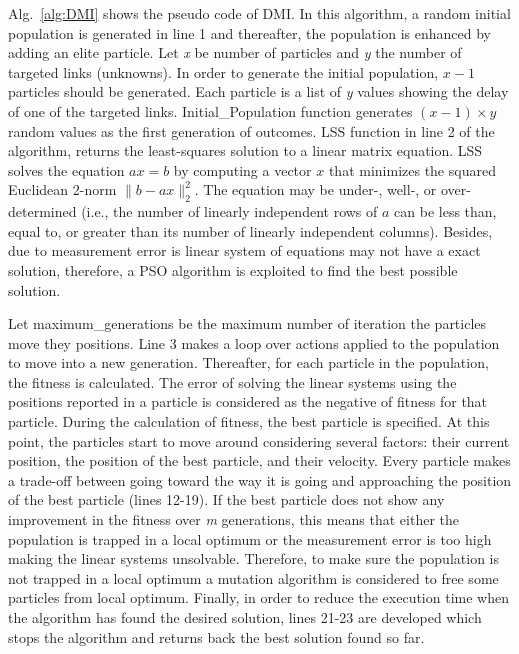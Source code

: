 \documentclass[10pt, journal, letterpaper]{IEEEtran}
\begin{document}
Alg.~\ref{alg:DMI} shows the pseudo code of DMI. In this algorithm, a random initial population is generated in line 1 and thereafter, the population is enhanced by adding an elite particle. Let \textit{x} be number of particles and \textit{y} the number of targeted links (unknowns). In order to generate the initial population, $x-1$ particles should be generated. Each particle is a list of \textit{y} values showing the delay of one of the targeted links. Initial\_Population function generates $(x-1)\times y$ random values as the first generation of outcomes. LSS function in line 2 of the algorithm, returns the least-squares solution to a linear matrix equation. LSS solves the equation $ax = b$ by computing a vector $x$ that minimizes the squared Euclidean 2-norm $\| b - a x \|^2_2$. The equation may be under-, well-, or over-determined (i.e., the number of linearly independent rows of $a$ can be less than, equal to, or greater than its number of linearly independent columns)\cite{lstsq}. Besides, due to measurement error is linear system of equations may not have a exact solution, therefore, a PSO algorithm is exploited to find the best possible solution.

Let maximum\_generations be the maximum number of iteration the particles move they positions. Line 3 makes a loop over actions applied to the population to move into a new generation. Thereafter, for each particle in the population, the fitness is calculated. The error of solving the linear systems using the positions reported in a particle is considered as the negative of fitness for that particle. During the calculation of fitness, the best particle is specified. At this point, the particles start to move around considering several factors: their current position, the position of the best particle, and their velocity. Every particle makes a trade-off between going toward the way it is going and approaching the position of the best particle (lines 12-19). If the best particle does not show any improvement in the fitness over \textit{m} generations, this means that either the population is trapped in a local optimum or the measurement error is too high making the linear systems unsolvable. Therefore, to make sure the population is not trapped in a local optimum a mutation algorithm is considered to free some particles from local optimum. Finally, in order to reduce the execution time when the algorithm has found the desired solution, lines 21-23 are developed which stops the algorithm and returns back the best solution found so far.
\end{document}
